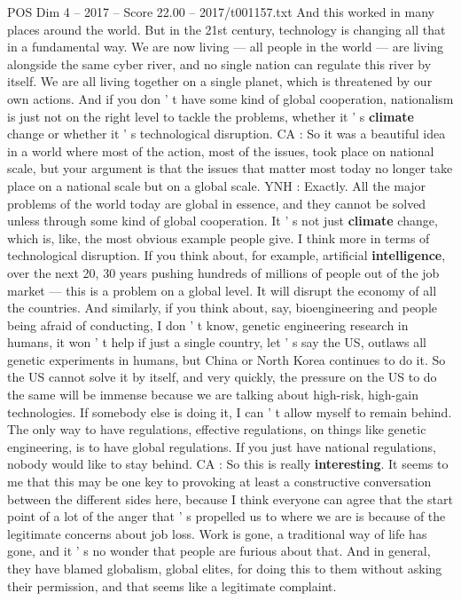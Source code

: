 \begin{textsample}{POS Dim 4 – 2017 – Score 22.00 – 2017/t001157.txt}
And this worked in many places around the world.
But in the 21st century, technology is changing all that in a fundamental way.
We are now living — all people in the world — are living alongside the same cyber river, and no single nation can regulate this river by itself.
We are all living together on a single planet, which is threatened by our own actions.
And if you don ' t have some kind of global cooperation, nationalism is just not on the right level to tackle the problems, whether it ' s \textbf{climate} change or whether it ' s technological disruption.
CA : So it was a beautiful idea in a world where most of the action, most of the issues, took place on national scale, but your argument is that the issues that matter most today no longer take place on a national scale but on a global scale.
YNH : Exactly.
All the major problems of the world today are global in essence, and they cannot be solved unless through some kind of global cooperation.
It ' s not just \textbf{climate} change, which is, like, the most obvious example people give.
I think more in terms of technological disruption.
If you think about, for example, artificial \textbf{intelligence}, over the next 20, 30 years pushing hundreds of millions of people out of the job market — this is a problem on a global level.
It will disrupt the economy of all the countries.
And similarly, if you think about, say, bioengineering and people being afraid of conducting, I don ' t know, genetic engineering research in humans, it won ' t help if just a single country, let ' s say the US, outlaws all genetic experiments in humans, but China or North Korea continues to do it.
So the US cannot solve it by itself, and very quickly, the pressure on the US to do the same will be immense because we are talking about high-risk, high-gain technologies.
If somebody else is doing it, I can ' t allow myself to remain behind.
The only way to have regulations, effective regulations, on things like genetic engineering, is to have global regulations.
If you just have national regulations, nobody would like to stay behind.
CA : So this is really \textbf{interesting}.
It seems to me that this may be one key to provoking at least a constructive conversation between the different sides here, because I think everyone can agree that the start point of a lot of the anger that ' s propelled us to where we are is because of the legitimate concerns about job loss.
Work is gone, a traditional way of life has gone, and it ' s no wonder that people are furious about that.
And in general, they have blamed globalism, global elites, for doing this to them without asking their permission, and that seems like a legitimate complaint.

\end{textsample}
